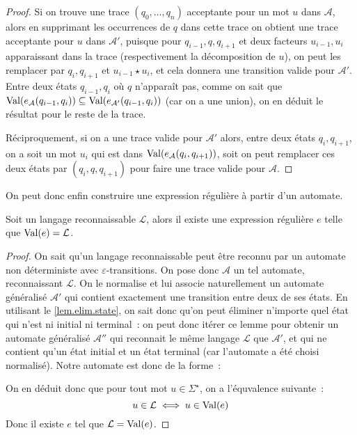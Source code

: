 \begin{proof}
  Si on trouve une trace $(q_0,\ldots,q_n)$ acceptante pour un mot $u$ dans
  $\mathcal A$, alors en supprimant les occurrences de $q$ dans cette trace
  on obtient une trace acceptante pour $u$ dans $\mathcal A'$, puisque pour
  $q_{i-1},q,q_{i+1}$ et deux facteurs $u_{i-1},u_i$ apparaissant dans la trace
  (respectivement la décomposition de $u$), on peut les remplacer par
  $q_i,q_{i+1}$ et $u_{i-1}\star u_i$, et cela donnera une transition valide pour
  $\mathcal A'$. Entre deux états $q_{i-1},q_i$ où $q$ n'apparaît pas, comme
  on sait que
  $\operatorname{Val}(e_{\mathcal A}(q_{i-1},q_i))\subseteq \operatorname{Val}(e_{\mathcal A'}(q_{i-1},q_i))$
  (car on a une union), on en déduit le résultat pour le reste de la trace.

  Réciproquement, si on a une trace valide pour $\mathcal A'$ alors, entre deux
  états $q_{i},q_{i+1}$, on a soit un mot $u_i$ qui est dans
  $\operatorname{Val}(e_{\mathcal A}(q_i,q_{i+1}))$, soit on peut remplacer ces deux états par
  $(q_i,q,q_{i+1})$ pour faire une trace valide pour $\mathcal A$.
\end{proof}

On peut donc enfin construire une expression régulière à partir d'un automate.

\begin{proposition}
  Soit un langage reconnaissable $\mathcal L$, alors il existe une expression
  régulière $e$ telle que $\operatorname{Val}(e) = \mathcal L$.
\end{proposition}

\begin{proof}
  On sait qu'un langage reconnaissable peut être reconnu par un automate non
  déterministe avec $\varepsilon$-transitions. On pose donc $\mathcal A$ un
  tel automate, reconnaissant $\mathcal L$. On le normalise et lui associe
  naturellement un automate généralisé $\mathcal A'$ qui contient exactement une
  transition entre deux de ses états. En utilisant le \cref{lem.elim.state},
  on sait donc qu'on peut éliminer n'importe quel état qui n'est ni initial ni
  terminal~: on peut donc itérer ce lemme pour obtenir un automate généralisé
  $\mathcal A''$ qui reconnait le même langage $\mathcal L$ que $\mathcal A'$,
  et qui ne contient qu'un état initial et un état terminal (car l'automate
  a été choisi normalisé). Notre automate est donc de la forme~:
  \begin{figure}[h]
    \centering
  \end{figure}
  
  On en déduit donc que pour tout mot $u \in \Sigma^\star$, on a l'équvalence
  suivante~:
  \[u \in \mathcal L \iff u \in \operatorname{Val}(e)\]
  Donc il existe $e$ tel que $\mathcal L = \operatorname{Val}(e)$.
\end{proof}

